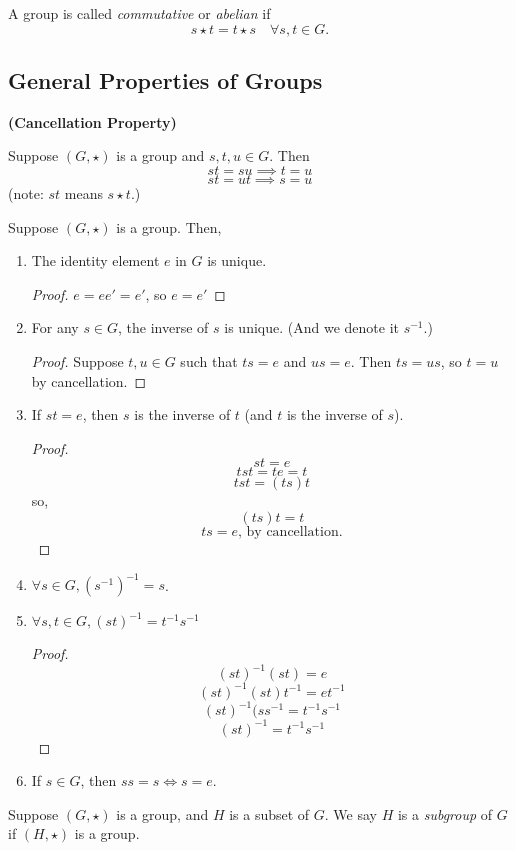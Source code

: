 \documentclass[a5paper]{article}
\begin{document}
\begin{definition*}
A group is called \emph{commutative} or \emph{abelian} if $$s\star t = t \star s \quad \forall s,t \in G.$$
\end{definition*}

\subsection{General Properties of Groups}

\begin{definition*}\textbf{(Cancellation Property)}

Suppose $(G,\star)$ is a group and $s,t,u \in G$. Then 
$$st = su \implies t = u$$
$$st = ut \implies s = u$$
(note: $st$ means $s\star t$.)
\end{definition*}

\begin{proposition*}
Suppose $(G,\star)$ is a group. Then,
\begin{enumerate}
\item The identity element $e$ in $G$ is unique. 
\begin{proof}$e = ee' = e'$, so $e= e'$\end{proof}
\item For any $s\in G$, the inverse of $s$ is unique. (And we denote it $s^{-1}$.)
\begin{proof}Suppose $t,u \in G$ such that $ts = e$ and $us = e$. Then $ts = us$, so $t = u$ by cancellation. \end{proof}
\item If $st = e$, then $s$ is the inverse of $t$ (and $t$ is the inverse of $s$). 
\begin{proof}
$$st=e$$
$$tst=te=t$$
$$tst=(ts)t$$
so, 
$$(ts)t=t$$
$$ts=e \text{, by cancellation.}$$
\end{proof}
\item $\forall s \in G, (s^{-1})^{-1}=s$. 
\item $\forall s,t \in G, (st)^{-1}=t^{-1}s^{-1}$
\begin{proof}
$$(st)^{-1}(st)=e$$
$$(st)^{-1}(st)t^{-1}=et^{-1}$$
$$(st)^{-1}(ss^{-1}=t^{-1}s^{-1}$$
$$(st)^{-1}=t^{-1}s^{-1}$$
\end{proof}
\item If $s \in G$, then $ss=s \iff s=e$. 
\end{enumerate}
\end{proposition*}

\begin{definition*}
Suppose $(G,\star)$ is a group, and $H$ is a subset of $G$. We say $H$ is a \emph{subgroup} of $G$ if $(H,\star)$ is a group.
\end{definition*}
\end{document}

